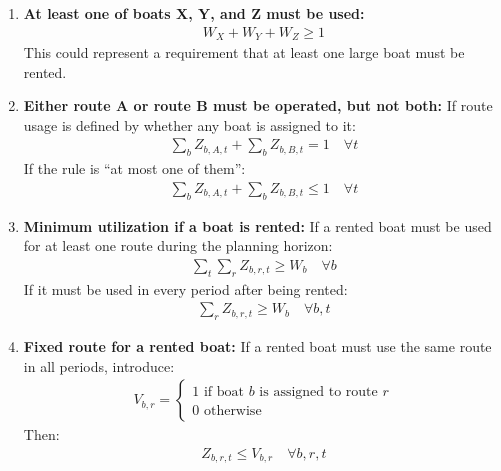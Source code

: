 \documentclass[10pt]{article}
\begin{document}
\begin{enumerate}
    \begin{gather*}
        W_X + W_Z \le 1
    \end{gather*}
    If this only applies in a specific period, use route assignment variables:
    \begin{gather*}
        \sum_r Z_{X,r,t} + \sum_r Z_{Z,r,t} \le 1 \quad \forall t
    \end{gather*}
    \item \textbf{At least one of boats X, Y, and Z must be used:}
    \begin{gather*}
        W_X + W_Y + W_Z \ge 1
    \end{gather*}
    This could represent a requirement that at least one large boat must be rented.
    \item \textbf{Either route A or route B must be operated, but not both:} If route usage is defined by whether any boat is assigned to it:
    \begin{gather*}
        \sum_b Z_{b,A,t} + \sum_b Z_{b,B,t} = 1 \quad \forall t
    \end{gather*}
    If the rule is ``at most one of them'':
    \begin{gather*}
        \sum_b Z_{b,A,t} + \sum_b Z_{b,B,t} \le 1 \quad \forall t
    \end{gather*}
    \item \textbf{Minimum utilization if a boat is rented:} If a rented boat must be used for at least one route during the planning horizon:
    \begin{gather*}
        \sum_t \sum_r Z_{b,r,t} \ge W_b \quad \forall b
    \end{gather*}
    If it must be used in every period after being rented:
    \begin{gather*}
        \sum_r Z_{b,r,t} \ge W_b \quad \forall b,t
    \end{gather*}
    \item \textbf{Fixed route for a rented boat:} If a rented boat must use the same route in all periods, introduce:
    \begin{gather*}
        V_{b,r} =
            \begin{cases}
            1 \text{ if boat } b \text{ is assigned to route } r\\
            0 \text{ otherwise}
            \end{cases}
    \end{gather*}
    Then:
    \begin{gather*}
        Z_{b,r,t} \le V_{b,r} \quad \forall b,r,t\\

\end{gather*}
\end{enumerate}
\end{document}
